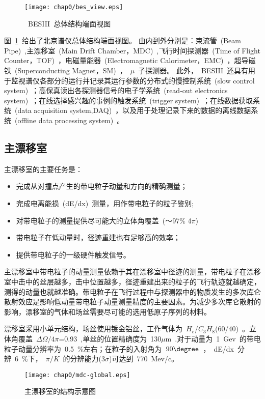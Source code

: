 \begin{figure}[!h]
  \centering
  \texttt{[image: chap0/bes\_view.eps]}
  \caption{~BESIII~总体结构端面视图}
  \label{fig:BESIII}
\end{figure}
图~\ref{fig:BESIII}~给出了北京谱仪总体结构端面视图。
由内到外分别是：束流管~(Beam Pipe)~,主漂移室~(Main Drift Chamber，MDC)~,飞行时间探测器~(Time of Flight Counter，TOF)~，电磁量能器~(Electromagnetic Calorimeter，EMC)~，超导磁铁~(Superconducting Magnet，SM)~，~$\mu$~子探测器。
此外，~BESIII~还具有用于监视谱仪各部分的运行并记录其运行参数的分布式的慢控制系统~(slow control system)~；高保真读出各探测器信号的电子学系统~(read-out electronics system)~；在线选择感兴趣的事例的触发系统~(trigger system)~；在线数据获取系统~(data acquisition system,DAQ)~，以及用于处理记录下来的数据的离线数据系统~(offline data processing system)~。
\subsection{主漂移室}
主漂移室的主要任务是：

\begin{itemize}
\item{完成从对撞点产生的带电粒子动量和方向的精确测量；}
\item{完成电离能损~(dE/dx)~测量，用作带电粒子的粒子鉴别;}
\item{对带电粒子的测量提供尽可能大的立体角覆盖~(～97$\%$ 4$\pi$)~}
\item{带电粒子在低动量时，径迹重建也有足够高的效率；}
\item{提供带电粒子的一级硬件触发信号。}
\end{itemize}


主漂移室中带电粒子的动量测量依赖于其在漂移室中径迹的测量，带电粒子在漂移室中击中的丝层越多，击中位置越多，径迹重建出来的粒子的飞行轨迹就越确定，测得的动量也就越准确。带电粒子在飞行过程中与探测器中的物质发生的多次库仑散射效应是影响低动量带电粒子动量测量精度的主要因素。为减少多次库仑散射的影响，漂移室的气体和场丝需要尽可能的选用低原子序列的材料。

漂移室采用小单元结构，场丝使用镀金铝丝，工作气体为~$H_{e}$/$C_{3}H_{8}$(60/40)~。立体角覆盖~$\Delta\Omega/4\pi$=0.93~,单丝的位置精确度为~130$\mu$m~.对于动量为~1~Gev~的带电粒子动量分辨率为~0.5~$\%$左右；在粒子的入射角为~$90\degree$~，~dE/dx~分辨~6~$\%$下，~$\pi/K$~的分辨能力(3$\sigma$)可达到~770~Mev/c。
\begin{figure}[!h]
  \centering
  \texttt{[image: chap0/mdc-global.eps]}
  \caption{主漂移室的结构示意图}
  \label{fig:mdc-global}
\end{figure}

